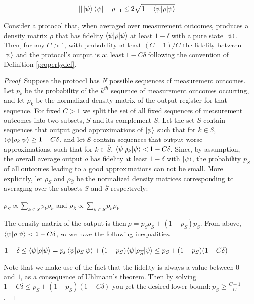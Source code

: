 \documentclass[12pt]{dalthesis}
\begin{document}
\begin{equation}
\label{Fuchs2}
||\ket{\psi} \bra{\psi} - \rho ||_1 \leq 2\sqrt{1 - \braket{\psi | \rho | \psi}}
\end{equation}

\begin{lemma}
\label{lemma5.4}
Consider a protocol that, when averaged over measurement outcomes, produces a density matrix $\rho$ that has fidelity $\braket{\psi | \rho | \psi}$ at least $1 - \delta$ with a pure state $\ket{\psi}$. Then, for any $C > 1$, with probability at least $(C-1)/C$ the fidelity between $\ket{\psi}$ and the protocol's output is at least $1 - C\delta$ following the convention of Definition \ref{propertydef}.
\end{lemma}

\begin{proof}
Suppose the protocol has $N$ possible sequences of measurement outcomes. Let $p_k$ be the probability of the $k^{th}$ sequence of measurement outcomes occurring, and let $\rho_k$ be the normalized density matrix of the output register for that sequence.
For fixed $C > 1$ we split the set of all fixed sequences of measurement outcomes into two subsets, $S$ and its complement $\overline{S}$. Let the set $S$ contain sequences that output good approximations of $\ket{\psi}$ such that for $k \in S$, $\braket{\psi | \rho_k | \psi} \geq 1 - C \delta$, and let $\overline{S}$ contain sequences that output worse approximations, such that for $k \in \overline{S}$, $\braket{\psi | \rho_k | \psi} < 1 - C \delta$. Since, by assumption, the overall average output $\rho$ has fidelity at least $1 - \delta$ with $\ket{\psi}$, the probability $p_S$ of all outcomes leading to a good approximations can not be small. More explicitly, let $\rho_S$ and $\rho_{\overline{S}}$ be the normalized density matrices corresponding to averaging over the subsets $S$ and $\overline{S}$ respectively:
\begin{center}
$\rho_S \propto \sum\limits_{k \in S} p_k \rho_k$ and $\rho_{\overline{S}} \propto \sum\limits_{k \in \overline{S}} p_k \rho_k$
\end{center}
The density matrix of the output is then $\rho = p_S \rho_S + (1 - p_S)p_{\overline{S}}$. From above, $\braket{\psi | \rho | \psi} < 1 - C \delta$, so we have the following inequalities:
\begin{center}
$1 - \delta \leq \braket{\psi | \rho | \psi} = p_s \braket{\psi | \rho_S | \psi} + (1 - p_S) \braket{\psi | \rho_{\overline{S}} | \psi} \leq p_S + (1 - p_S)(1 - C \delta)$
\end{center}
Note that we make use of the fact that the fidelity is always a value between $0$ and $1$, as a consequence of Uhlmann's theorem. Then by solving $1 - C \delta \leq p_S + (1 - p_S)(1 - C \delta)$ you get the desired lower bound: $p_S \geq \frac{C-1}{C}$.


\end{proof}
\end{document}

